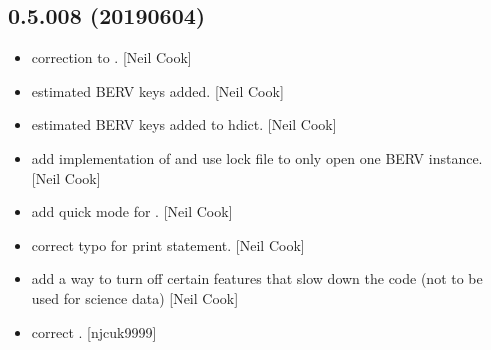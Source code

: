 \documentclass[a4paper,10pt,english]{report}
\begin{document}
\subsection{0.5.008 (2019\sphinxhyphen{}06\sphinxhyphen{}04)}
\label{\detokenize{misc/changelog:id148}}\begin{itemize}
\item {} 
 \sphinxhyphen{} correction to . {[}Neil Cook{]}

\item {} 
 \sphinxhyphen{} estimated BERV keys added. {[}Neil Cook{]}

\item {} 
 \sphinxhyphen{} estimated BERV keys added to hdict. {[}Neil
Cook{]}

\item {} 
 \sphinxhyphen{} add implementation of  and use lock file to
only open one BERV instance. {[}Neil Cook{]}

\item {} 
 \sphinxhyphen{} add quick mode for . {[}Neil Cook{]}

\item {} 
 \sphinxhyphen{} correct typo for print statement. {[}Neil Cook{]}

\item {} 
 \sphinxhyphen{} add a way to turn off certain features that
slow down the code (not to be used for science data) {[}Neil Cook{]}

\item {} 
 \sphinxhyphen{} correct . {[}njcuk9999{]}

\end{itemize}
\end{document}
